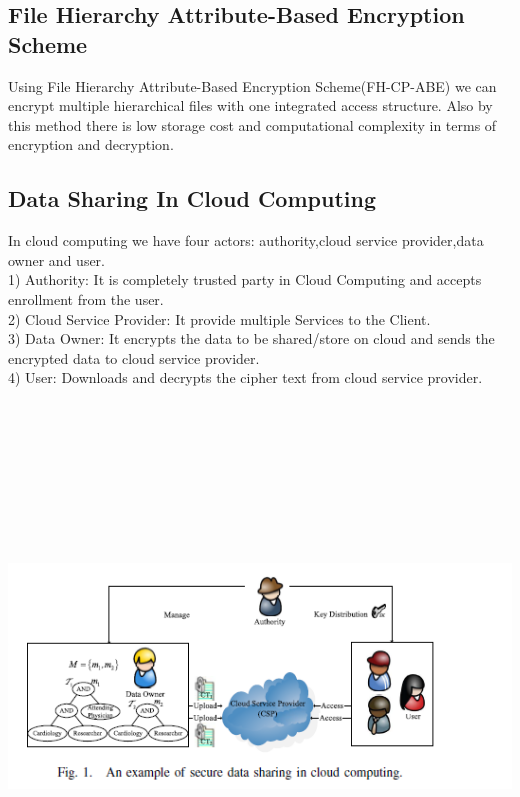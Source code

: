\documentclass[a4paper,12pt]{article}
\begin{document}
\subsection{File Hierarchy Attribute-Based Encryption Scheme}
Using File Hierarchy Attribute-Based Encryption Scheme(FH-CP-ABE)\cite{2a} we can encrypt multiple hierarchical files with one integrated access structure. Also by this method there is low storage cost and computational complexity in terms of encryption and decryption.

\subsection{Data Sharing In Cloud Computing}
In cloud computing\cite{3a,4a} we have four actors: authority,cloud service provider,data owner and user.\\
1) Authority: It is completely trusted party in Cloud Computing and accepts enrollment from the user.\\
2) Cloud Service Provider: It provide multiple Services to the Client.\\
3) Data Owner: It encrypts the data to be shared/store on cloud and sends the encrypted data to cloud service provider.\\
4) User: Downloads and decrypts the cipher text from cloud service provider.

\includegraphics[width=16.5cm,height=14.5cm]{fig1.PNG}
\newpage
\end{document}
